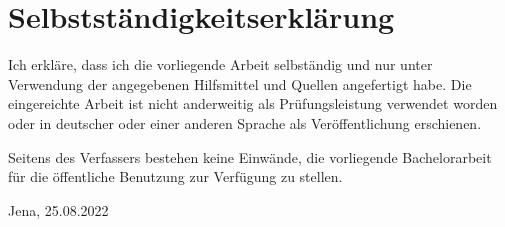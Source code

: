\documentclass[12pt, a4paper]{report}
\begin{document}
\chapter*{Selbstständigkeitserklärung}
Ich erkläre, dass ich die vorliegende Arbeit selbständig und nur unter Verwendung der angegebenen Hilfsmittel und Quellen angefertigt habe.
Die eingereichte Arbeit ist nicht anderweitig als Prüfungsleistung verwendet worden oder in deutscher oder einer anderen Sprache als Veröffentlichung erschienen.

\setlength{\parindent}{0pt}
\vspace{10pt}
Seitens des Verfassers bestehen keine Einwände, die vorliegende Bachelorarbeit für die öffentliche Benutzung zur Verfügung zu stellen. \vspace{50pt}

Jena, 25.08.2022
\end{document}
